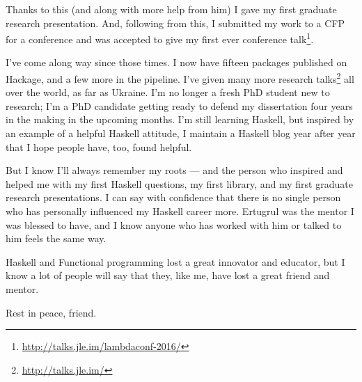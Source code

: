 \documentclass[]{article}
\renewcommand{\href}[2]{#2\footnote{\url{#1}}}
\begin{document}
Thanks to this (and along with more help from him) I gave my first graduate
research presentation. And, following from this, I submitted my work to a CFP
for a conference and was \href{http://talks.jle.im/lambdaconf-2016/}{accepted to
give my first ever conference talk}.

I've come along way since those times. I now have fifteen packages published on
Hackage, and a few more in the pipeline. I've given
\href{http://talks.jle.im/}{many more research talks} all over the world, as far
as Ukraine. I'm no longer a fresh PhD student new to research; I'm a PhD
candidate getting ready to defend my dissertation four years in the making in
the upcoming months. I'm still learning Haskell, but inspired by an example of a
helpful Haskell attitude, I maintain a Haskell blog year after year that I hope
people have, too, found helpful.

But I know I'll always remember my roots --- and the person who inspired and
helped me with my first Haskell questions, my first library, and my first
graduate research presentations. I can say with confidence that there is no
single person who has personally influenced my Haskell career more. Ertugrul was
the mentor I was blessed to have, and I know anyone who has worked with him or
talked to him feels the same way.

Haskell and Functional programming lost a great innovator and educator, but I
know a lot of people will say that they, like me, have lost a great friend and
mentor.

Rest in peace, friend.
\end{document}
